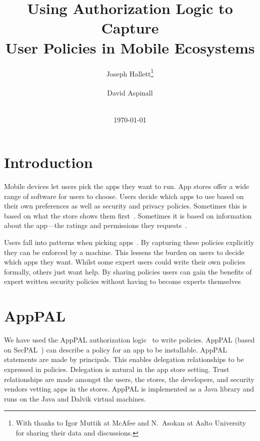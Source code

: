 \documentclass[]{soups-poster}
\newcommand{\citep}[1]{\cite{#1}}
\begin{document}
\title{Using Authorization Logic to Capture\\User Policies in Mobile Ecosystems}
\author{%
  \alignauthor{}
  Joseph Hallett\thanks{With thanks to Igor Muttik at McAfee and N{.}~Asokan at Aalto University for sharing their data and discussions.}\\
  \\
  \alignauthor{}
  David Aspinall\\
  \\
}
\date\today
\maketitle

\section{Introduction}

Mobile devices let users pick the apps they want to run.
App stores offer a wide range of software for users to choose.
Users decide which apps to use based on their own preferences as well as security and privacy policies.
Sometimes this is based on what the store shows them first~\citep{Prata:2012in}.
Sometimes it is based on information about the app---the ratings and permissions they requests~\citep{Kelley:2013kc}.

Users fall into patterns when picking apps~\citep{Sadeh:2014vq}.
By capturing these policies explicitly they can be enforced by a machine.
This lessens the burden on users to decide which apps they want.
Whilst some expert users could write their own policies formally, others
just want help.  By sharing policies users can gain the benefits of expert
written security policies without having to become experts themselves

\section{AppPAL}

We have used the AppPAL authorization logic~\citep{Hallett:2014un} to write policies.
AppPAL (based on SecPAL~\citep{Becker:2006vh}) can describe a policy for an app to be installable. 
AppPAL statements are made by principals.
This enables delegation relationships to be expressed in policies.
Delegation is natural in the app store setting. 
Trust relationships are made amongst the users, the stores, the developers, and security vendors vetting apps in the stores.
AppPAL is implemented as a Java library and runs on the Java and Dalvik virtual machines.
\end{document}
